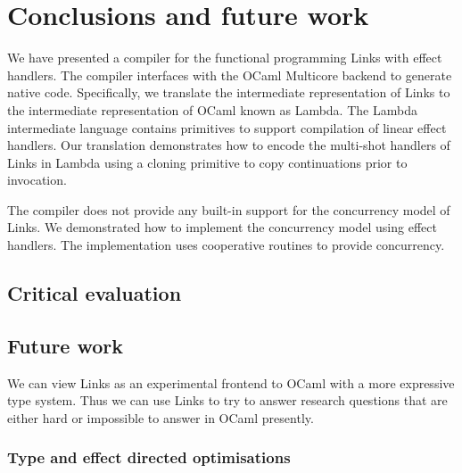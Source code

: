 \documentclass[12pt,mscres,cdtppar,twoside,openright,logo,rightchapter,normalheadings]{infthesis}
\theoremstyle{definition}
\begin{document}
\chapter{Conclusions and future work}
\label{ch:conclusions}

We have presented a compiler for the functional programming Links with
effect handlers. The compiler interfaces with the OCaml Multicore
backend to generate native code. Specifically, we translate the
intermediate representation of Links to the intermediate
representation of OCaml known as Lambda. The Lambda intermediate
language contains primitives to support compilation of linear effect
handlers. Our translation demonstrates how to encode the multi-shot
handlers of Links in Lambda using a cloning primitive to copy
continuations prior to invocation.

%

The compiler does not provide any built-in support for the concurrency
model of Links. We demonstrated how to implement the concurrency model
using effect handlers. The implementation uses cooperative routines to
provide concurrency.

\section{Critical evaluation}
\label{sec:criticaleval}



\section{Future work}
\label{sec:futurework}

We can view Links as an experimental frontend to OCaml with a more
expressive type system. Thus we can use Links to try to answer
research questions that are either hard or impossible to answer in
OCaml presently.

\subsection{Type and effect directed optimisations}
\end{document}
